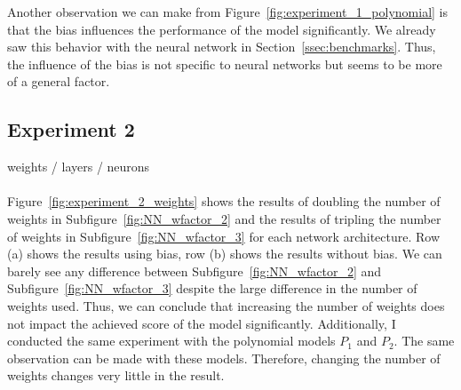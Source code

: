 Another observation we can make from Figure~\ref{fig:experiment_1_polynomial} is that the bias influences the performance of the model significantly. We already saw this behavior with the neural network in Section~\ref{ssec:benchmarks}. Thus, the influence of the bias is not specific to neural networks but seems to be more of a general factor.


\subsection{Experiment 2}
weights / layers / neurons \\ \\
Figure~\ref{fig:experiment_2_weights} shows the results of doubling the number of weights in Subfigure~\ref{fig:NN_wfactor_2} and the results of tripling the number of weights in Subfigure~\ref{fig:NN_wfactor_3} for each network architecture. Row (a) shows the results using bias, row (b) shows the results without bias. We can barely see any difference between Subfigure~\ref{fig:NN_wfactor_2} and Subfigure~\ref{fig:NN_wfactor_3} despite the large difference in the number of weights used. Thus, we can conclude that increasing the number of weights does not impact the achieved score of the model significantly. Additionally, I conducted the same experiment with the polynomial models $P_1$ and $P_2$. The same observation can be made with these models. Therefore, changing the number of weights changes very little in the result.

